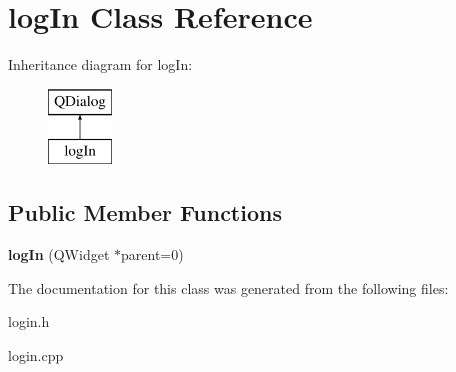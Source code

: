 \hypertarget{classlog_in}{}\section{log\+In Class Reference}
\label{classlog_in}
Inheritance diagram for log\+In\+:\begin{figure}[H]
\begin{center}
\leavevmode
\includegraphics[height=2.000000cm]{classlog_in}
\end{center}
\end{figure}
\subsection*{Public Member Functions}
\begin{DoxyCompactItemize}
\item 
\mbox{\label{classlog_in_ab9ea8b8e3ab32fe2acdc5058b5ba078f}} 
{\bfseries log\+In} (Q\+Widget $\ast$parent=0)
\end{DoxyCompactItemize}


The documentation for this class was generated from the following files\+:\begin{DoxyCompactItemize}
\item 
login.\+h\item 
login.\+cpp\end{DoxyCompactItemize}
